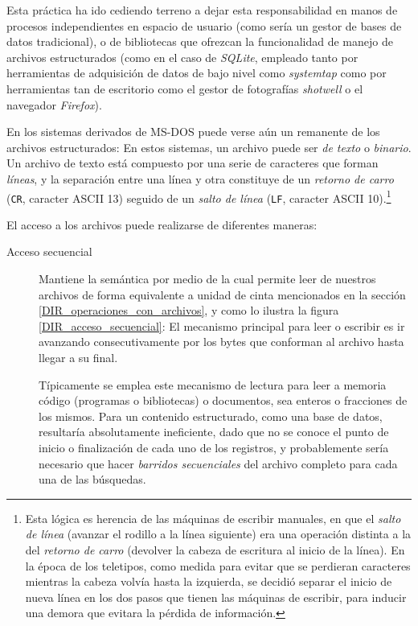 \documentclass[11pt,fleqn]{book} %
\begin{document}
Esta práctica ha ido cediendo terreno a dejar esta responsabilidad en
manos de procesos independientes en espacio de usuario (como sería un
gestor de bases de datos tradicional), o de bibliotecas que ofrezcan
la funcionalidad de manejo de archivos estructurados (como en el caso
de \emph{SQLite}, empleado tanto por herramientas de adquisición de datos
de bajo nivel como \emph{systemtap} como por herramientas tan de escritorio
como el gestor de fotografías \emph{shotwell} o el navegador \emph{Firefox}).

En los sistemas derivados de MS-DOS puede verse aún un remanente de
los archivos estructurados: En estos sistemas, un archivo puede ser
\emph{de texto} o \emph{binario}. Un archivo de texto está compuesto por una
serie de caracteres que forman \emph{líneas}, y la separación entre una
línea y otra constituye de un \emph{retorno de carro} (\texttt{CR}, caracter
ASCII 13) seguido de un \emph{salto de línea} (\texttt{LF}, caracter ASCII
10).\footnote{Esta lógica es herencia de las máquinas de escribir
manuales, en que el \emph{salto de línea} (avanzar el rodillo a la línea
siguiente) era una operación distinta a la del \emph{retorno de carro}
(devolver la cabeza de escritura al inicio de la línea). En la época
de los teletipos, como medida para evitar que se perdieran caracteres
mientras la cabeza volvía hasta la izquierda, se decidió separar el
inicio de nueva línea en los dos pasos que tienen las máquinas de
escribir, para inducir una demora que evitara la pérdida de
información. }

El acceso a los archivos puede realizarse de diferentes maneras:

\begin{description}
\item[Acceso secuencial] Mantiene la semántica por medio de la cual
     permite leer de nuestros archivos de forma equivalente a
     unidad de cinta mencionados en la sección
     \ref{DIR_operaciones_con_archivos}, y como lo ilustra la figura
     \ref{DIR_acceso_secuencial}:
     El mecanismo principal para leer o escribir es ir avanzando
     consecutivamente por los bytes que conforman al archivo hasta
     llegar a su final.

     Típicamente se emplea este mecanismo de lectura para leer a
     memoria código (programas o bibliotecas) o documentos, sea
     enteros o fracciones de los mismos. Para un contenido
     estructurado, como una base de datos, resultaría absolutamente
     ineficiente, dado que no se conoce el punto de inicio o
     finalización de cada uno de los registros, y probablemente sería
     necesario que hacer \emph{barridos secuenciales} del archivo completo
     para cada una de las búsquedas.
\end{description}
\end{document}
